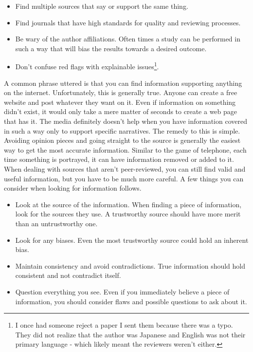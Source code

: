 \documentclass[10pt, a4paper, twocolumn]{book}
\begin{document}
\begin{itemize}
	\item Find multiple sources that say or support the same thing.
	\item Find journals that have high standards for quality and reviewing processes.
	\item Be wary of the author affiliations. Often times a study can be performed in such a way that will bias the results towards a desired outcome.
	\item Don't confuse red flags with explainable issues\footnote{I once had someone reject a paper I sent them because there was a typo. They did not realize that the author was Japanese and English was not their primary language - which likely meant the reviewers weren't either.}. 
\end{itemize}

A common phrase uttered is that you can find information supporting anything on the internet. Unfortunately, this is generally true. Anyone can create a free website and post whatever they want on it. Even if information on something didn't exist, it would only take a mere matter of seconds to create a web page that has it. The media definitely doesn't help when you have information covered in such a way only to support specific narratives. The remedy to this is simple. Avoiding opinion pieces and going straight to the source is generally the easiest way to get the most accurate information. Similar to the game of telephone, each time something is portrayed, it can have information removed or added to it. When dealing with sources that aren't peer-reviewed, you can still find valid and useful information, but you have to be much more careful. A few things you can consider when looking for information follows.

\begin{itemize}
	\item Look at the source of the information. When finding a piece of information, look for the sources they use. A trustworthy source should have more merit than an untrustworthy one. 
	\item Look for any biases. Even the most trustworthy source could hold an inherent bias.
	\item Maintain consistency and avoid contradictions. True information should hold consistent and not contradict itself.
	\item Question everything you see. Even if you immediately believe a piece of information, you should consider flaws and possible questions to ask about it.
\end{itemize}
\end{document}
